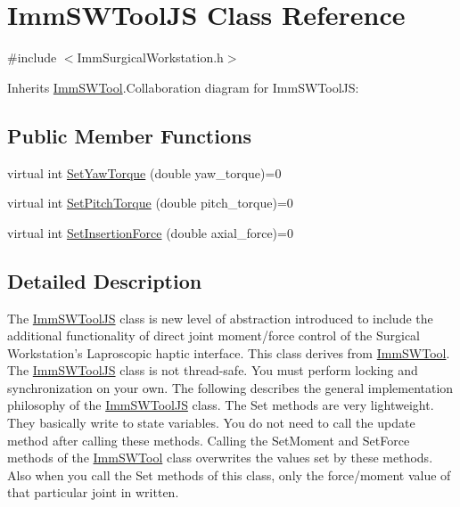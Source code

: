 \hypertarget{classImmSWToolJS}{
\section{ImmSWToolJS Class Reference}
\label{classImmSWToolJS}
}


{\ttfamily \#include $<$ImmSurgicalWorkstation.h$>$}

Inherits \hyperlink{classImmSWTool}{ImmSWTool}.Collaboration diagram for ImmSWToolJS:\subsection*{Public Member Functions}
\begin{DoxyCompactItemize}
\item 
virtual int \hyperlink{classImmSWToolJS_ad0901e3f1fc9fb3788f96ec74d43da3a}{SetYawTorque} (double yaw\_\-torque)=0
\item 
virtual int \hyperlink{classImmSWToolJS_a9512db780275a00a5ba48f1d4f160549}{SetPitchTorque} (double pitch\_\-torque)=0
\item 
virtual int \hyperlink{classImmSWToolJS_a0525da3b9b1274d6dc747da86da49552}{SetInsertionForce} (double axial\_\-force)=0
\end{DoxyCompactItemize}


\subsection{Detailed Description}
The \hyperlink{classImmSWToolJS}{ImmSWToolJS} class is new level of abstraction introduced to include the additional functionality of direct joint moment/force control of the Surgical Workstation's Laproscopic haptic interface. This class derives from \hyperlink{classImmSWTool}{ImmSWTool}. The \hyperlink{classImmSWToolJS}{ImmSWToolJS} class is not thread-\/safe. You must perform locking and synchronization on your own. The following describes the general implementation philosophy of the \hyperlink{classImmSWToolJS}{ImmSWToolJS} class. The Set methods are very lightweight. They basically write to state variables. You do not need to call the update method after calling these methods. Calling the SetMoment and SetForce methods of the \hyperlink{classImmSWTool}{ImmSWTool} class overwrites the values set by these methods. Also when you call the Set methods of this class, only the force/moment value of that particular joint in written. 

